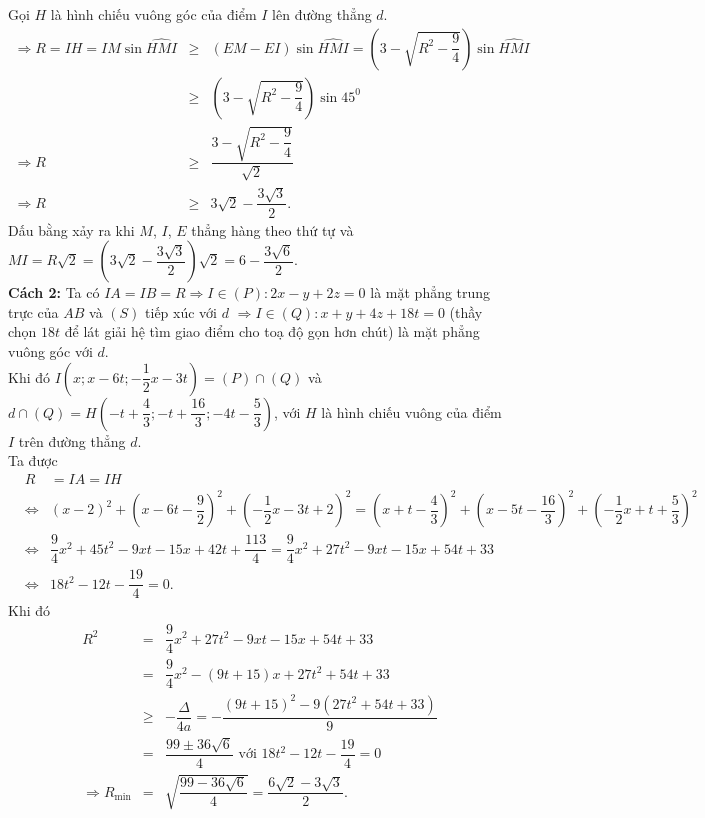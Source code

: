 \begin{ex}
{		Gọi $H$ là hình chiếu vuông góc của điểm $I$ lên đường thẳng $d$.
		\allowdisplaybreaks
		\begin{eqnarray*}
			\Rightarrow R=I H=I M \sin \widehat{H M I} &\geq&(E M-E I) \sin \widehat{H M I}
			=\left(3-\sqrt{R^2-\dfrac{9}{4}}\right) \sin \widehat{H M I}\\ &\geq&\left(3-\sqrt{R^2-\dfrac{9}{4}}\right) \sin 45^0 \\
			\Rightarrow R &\geq& \dfrac{3-\sqrt{R^2-\dfrac{9}{4}}}{\sqrt{2}} \\
			\Rightarrow R &\geq& 3 \sqrt{2}-\dfrac{3 \sqrt{3}}{2}.
		\end{eqnarray*}
		Dấu bằng xảy ra khi $M$, $I$, $E$ thẳng hàng theo thứ tự và $M I=R \sqrt{2}=\left(3 \sqrt{2}-\dfrac{3 \sqrt{3}}{2}\right) \sqrt{2}=6-\dfrac{3 \sqrt{6}}{2}$.\\
		\textbf{Cách 2:} Ta có $I A=I B=R \Rightarrow I \in(P)\colon 2 x-y+2 z=0$ là mặt phẳng trung trực của $A B$ và $(S)$ tiếp xúc với $d$
		$\Rightarrow I \in(Q)\colon x+y+4 z+18 t=0$ (thầy chọn $18 t$ để lát giải hệ tìm giao điểm cho toạ độ gọn hơn chút) là mặt phẳng vuông góc với $d$.\\
		Khi đó $I\left(x ; x-6 t ;-\dfrac{1}{2} x-3 t\right)=(P) \cap(Q)$ và $d \cap(Q)=H\left(-t+\dfrac{4}{3} ;-t+\dfrac{16}{3} ;-4 t-\dfrac{5}{3}\right)$, với $H$ là hình chiếu vuông của điểm $I$ trên đường thẳng $d$.\\
		Ta được
		\allowdisplaybreaks
		\begin{eqnarray*}
			&R&=IA=IH\\
			&\Leftrightarrow&(x-2)^2+\left(x-6 t-\dfrac{9}{2}\right)^2+\left(-\dfrac{1}{2} x-3 t+2\right)^2=\left(x+t-\dfrac{4}{3}\right)^2+\left(x-5 t-\dfrac{16}{3}\right)^2+\left(-\dfrac{1}{2} x+t+\dfrac{5}{3}\right)^2\\
			&\Leftrightarrow& \dfrac{9}{4} x^2+45 t^2-9 x t-15 x+42 t+\dfrac{113}{4}=\dfrac{9}{4} x^2+27 t^2-9 x t-15 x+54 t+33\\
			&\Leftrightarrow&18 t^2-12 t-\dfrac{19}{4}=0.
		\end{eqnarray*}
		Khi đó
		\allowdisplaybreaks
		\begin{eqnarray*}
			R^2&=&\dfrac{9}{4} x^2+27 t^2-9 x t-15 x+54 t+33\\
			&=&\dfrac{9}{4} x^2-(9 t+15) x+27 t^2+54 t+33\\
			&\geq&-\dfrac{\Delta}{4 a}=-\dfrac{(9 t+15)^2-9\left(27 t^2+54 t+33\right)}{9}\\
			&=&\dfrac{99 \pm 36 \sqrt{6}}{4} \text{ với } 18 t^2-12 t-\dfrac{19}{4}=0\\
			\Rightarrow R_{\min }&=&\sqrt{\dfrac{99-36 \sqrt{6}}{4}}=\dfrac{6 \sqrt{2}-3 \sqrt{3}}{2}.
		\end{eqnarray*}
	}
\end{ex}




